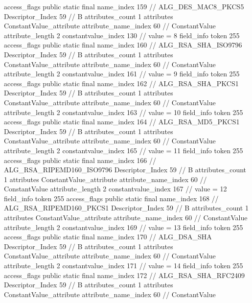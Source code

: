 {{{{{				access_flags	public static final
				name_index	159		// ALG_DES_MAC8_PKCS5
				Descriptor_Index	59		// B
				attributes_count	1
				attributes {
				ConstantValue_attribute {
					attribute_name_index	60		// ConstantValue
					attribute_length	2
					constantvalue_index	130		// value = 8
				}
				}
			}
			field_info {
				token	255
				access_flags	public static final
				name_index	160		// ALG_RSA_SHA_ISO9796
				Descriptor_Index	59		// B
				attributes_count	1
				attributes {
				ConstantValue_attribute {
					attribute_name_index	60		// ConstantValue
					attribute_length	2
					constantvalue_index	161		// value = 9
				}
				}
			}
			field_info {
				token	255
				access_flags	public static final
				name_index	162		// ALG_RSA_SHA_PKCS1
				Descriptor_Index	59		// B
				attributes_count	1
				attributes {
				ConstantValue_attribute {
					attribute_name_index	60		// ConstantValue
					attribute_length	2
					constantvalue_index	163		// value = 10
				}
				}
			}
			field_info {
				token	255
				access_flags	public static final
				name_index	164		// ALG_RSA_MD5_PKCS1
				Descriptor_Index	59		// B
				attributes_count	1
				attributes {
				ConstantValue_attribute {
					attribute_name_index	60		// ConstantValue
					attribute_length	2
					constantvalue_index	165		// value = 11
				}
				}
			}
			field_info {
				token	255
				access_flags	public static final
				name_index	166		// ALG_RSA_RIPEMD160_ISO9796
				Descriptor_Index	59		// B
				attributes_count	1
				attributes {
				ConstantValue_attribute {
					attribute_name_index	60		// ConstantValue
					attribute_length	2
					constantvalue_index	167		// value = 12
				}
				}
			}
			field_info {
				token	255
				access_flags	public static final
				name_index	168		// ALG_RSA_RIPEMD160_PKCS1
				Descriptor_Index	59		// B
				attributes_count	1
				attributes {
				ConstantValue_attribute {
					attribute_name_index	60		// ConstantValue
					attribute_length	2
					constantvalue_index	169		// value = 13
				}
				}
			}
			field_info {
				token	255
				access_flags	public static final
				name_index	170		// ALG_DSA_SHA
				Descriptor_Index	59		// B
				attributes_count	1
				attributes {
				ConstantValue_attribute {
					attribute_name_index	60		// ConstantValue
					attribute_length	2
					constantvalue_index	171		// value = 14
				}
				}
			}
			field_info {
				token	255
				access_flags	public static final
				name_index	172		// ALG_RSA_SHA_RFC2409
				Descriptor_Index	59		// B
				attributes_count	1
				attributes {
				ConstantValue_attribute {
					attribute_name_index	60		// ConstantValue
}}}}}}}

